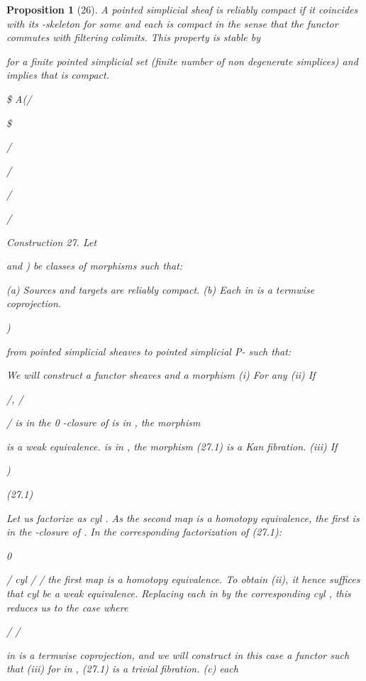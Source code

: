 \documentclass[11pt,a4paper]{article}
\theoremstyle{plain}
\newtheorem{proposition}[theorem]{Proposition}
\theoremstyle{definition}
\begin{document}
\begin{proposition}[26]
A pointed simplicial sheaf  is reliably compact if it coincides
with its -skeleton for some and each  is compact in the sense that the functor
  commutes with filtering colimits. This property is stable by 

for a finite pointed simplicial set (finite number of non degenerate simplices)
and implies that  is compact.

\$
A(/  

\$

/

/

/

/

Construction 27. Let

 and ) be classes of morphisms such that:

(a) Sources and targets are reliably compact.
(b) Each in is a termwise coprojection.

 )

 from pointed simplicial sheaves to pointed simplicial
P-  such that:

We will construct a functor
sheaves and a morphism
(i) For any
(ii) If



/, /

/  is in the 0 -closure of 
is in  , the morphism
     

is a weak equivalence.
is in , the morphism (27.1) is a Kan fibration.
(iii) If



)

(27.1)





 

Let us factorize
as
cyl
. As the second map is
a homotopy equivalence, the first is in the -closure of . In the corresponding
factorization of (27.1):

0



  / cyl  /    /
the first map is a homotopy equivalence. To obtain (ii), it hence suffices that
cyl
be a weak equivalence.
Replacing each
in
by the corresponding
cyl
, this
reduces us to the case where

   /    /



 

 in  is a termwise coprojection,
and we will construct in this case a functor  such that
(iii) for  in  , (27.1) is a trivial fibration.
(c) each


\end{proposition}
\end{document}
